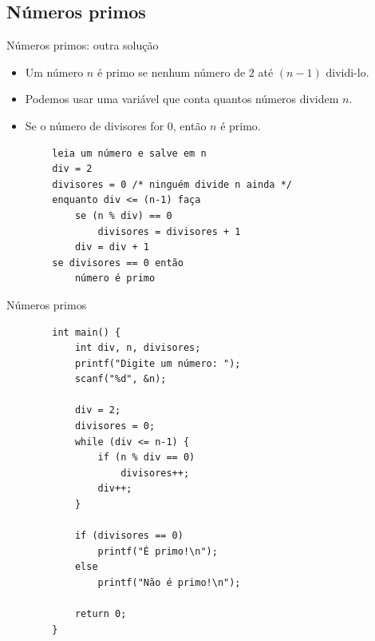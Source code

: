 \documentclass[handout]{beamer}
\begin{document}
\subsection{Números primos}%

\begin{frame}[fragile]{Números primos: outra solução}

    \begin{itemize}
        \item Um número $n$ é primo se nenhum número de $2$ até $(n-1)$ dividi-lo.
        \item Podemos usar uma variável que conta quantos números dividem $n$.
        \item Se o número de divisores for 0, então $n$ é primo.
    \end{itemize}

    \begin{verbatim}
        leia um número e salve em n
        div = 2
        divisores = 0 /* ninguém divide n ainda */
        enquanto div <= (n-1) faça
            se (n % div) == 0
                divisores = divisores + 1
            div = div + 1
        se divisores == 0 então
            número é primo
    \end{verbatim}
\end{frame}

\begin{frame}[fragile]{Números primos}

    \begin{verbatim}
        int main() {
            int div, n, divisores;
            printf("Digite um número: ");
            scanf("%d", &n);

            div = 2;
            divisores = 0;
            while (div <= n-1) {
                if (n % div == 0)
                    divisores++;
                div++;
            }

            if (divisores == 0)
                printf("É primo!\n");
            else
                printf("Não é primo!\n");

            return 0;
        }
    \end{verbatim}
\end{frame}
\end{document}
